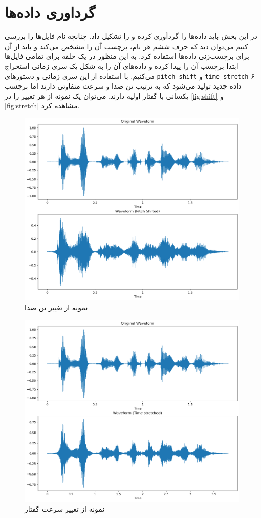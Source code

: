 \documentclass[11pt]{article}
\begin{document}
	\section{گرداوری داده‌ها}
	در این بخش باید داده‌ها را گردآوری کرده و  را تشکیل داد. چنانچه نام فایل‌ها را بررسی کنیم می‌توان دید که حرف ششم هر نام، برچسب آن را مشخص می‌کند و باید از آن برای برچسب‌زنی داده‌ها استفاده کرد. به این منظور در یک حلقه برای تمامی فایل‌ها ابتدا برچسب آن را پیدا کرده و داده‌های آن را به شکل یک سری زمانی استخراج می‌کنیم. با استفاده از این سری زمانی و دستور‌های 
	\verb|pitch_shift|
	و
	\verb|time_stretch|
	۶ داده جدید تولید می‌شود که به ترتیب تن صدا و سرعت متفاوتی دارند اما برچسب یکسانی با گفتار اولیه دارند. می‌توان یک نمونه‌ از هر تغییر را در
	\autoref{fig:shift}
	و
	\autoref{fig:stretch}
	مشاهده کرد.
	\begin{figure}[!h]
		\centerline{\includegraphics[width=0.7\linewidth]{../shift_ex.png}}
		\caption{نمونه از تغییر تن صدا}
		\label{fig:shift}
	\end{figure}
	\begin{figure}[!h]
		\centerline{\includegraphics[width=0.7\linewidth]{../stretch_ex.png}}
		\caption{نمونه از تغییر سرعت گفتار}
		\label{fig:stretch}
	\end{figure}\\
\end{document}
